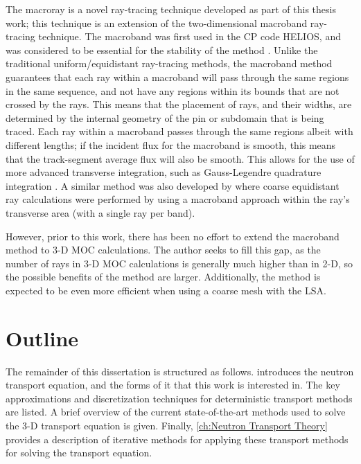 {{    The macroray is a novel ray-tracing technique developed as part of this thesis work; this technique is an extension of the two-dimensional macroband \cite{Villarino1992} ray-tracing technique.
    The macroband was first used in the \acf{CP} code HELIOS, and was considered to be essential for the stability of the method \cite{Villarino1992}.
    Unlike the traditional uniform/equidistant ray-tracing methods, the macroband method guarantees that each ray within a macroband will pass through the same regions in the same sequence, and not have any regions within its bounds that are not crossed by the rays.
    This means that the placement of rays, and their widths, are determined by the internal geometry of the pin or subdomain that is being traced.
    Each ray within a macroband passes through the same regions albeit with different lengths; if the incident flux for the macroband is smooth, this means that the track-segment average flux will also be smooth.
    This allows for the use of more advanced transverse integration, such as Gauss-Legendre quadrature integration \cite{Yamamoto2005}.
    A similar method was also developed by \citet{Fevotte2007} where coarse equidistant ray calculations were performed by using a macroband approach within the ray's transverse area (with a single ray per band).

    However, prior to this work, there has been no effort to extend the macroband method to 3-D \ac{MOC} calculations.
    The author seeks to fill this gap, as the number of rays in 3-D \ac{MOC} calculations is generally much higher than in 2-D, so the possible benefits of the method are larger.
    Additionally, the method is expected to be even more efficient when using a coarse mesh with the \ac{LSA}.
  }
  \section{Outline}{\label{sec:Introduction:Outline}
    The remainder of this dissertation is structured as follows.
     introduces the neutron transport equation, and the forms of it that this work is interested in.
    The key approximations and discretization techniques for deterministic transport methods are listed.
    A brief overview of the current state-of-the-art methods used to solve the 3-D transport equation is given.
    Finally, \cref{ch:Neutron Transport Theory} provides a description of iterative methods for applying these transport methods for solving the transport equation.

}}
